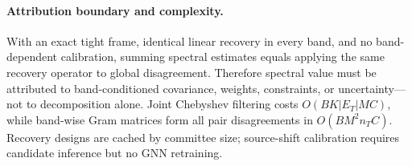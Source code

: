 \paragraph{Attribution boundary and complexity.}
With an exact tight frame, identical linear recovery in every band, and no
band-dependent calibration, summing spectral estimates equals applying the
same recovery operator to global disagreement. Therefore spectral value must
be attributed to band-conditioned covariance, weights, constraints, or
uncertainty---not to decomposition alone. Joint Chebyshev filtering costs
$O(BK|E_T|MC)$, while band-wise Gram matrices form all pair disagreements in
$O(BM^2n_TC)$. Recovery designs are cached by committee size; source-shift
calibration requires candidate inference but no GNN retraining.
